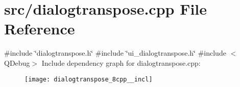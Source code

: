 \section{src/dialogtranspose.cpp File Reference}
\label{dialogtranspose_8cpp}
{\ttfamily \#include \char`\"{}dialogtranspose.\+h\char`\"{}}\newline
{\ttfamily \#include \char`\"{}ui\+\_\+dialogtranspose.\+h\char`\"{}}\newline
{\ttfamily \#include $<$Q\+Debug$>$}\newline
Include dependency graph for dialogtranspose.\+cpp\+:\nopagebreak
\begin{figure}[H]
\begin{center}
\leavevmode
\texttt{[image: dialogtranspose\_8cpp\_\_incl]}
\end{center}
\end{figure}
